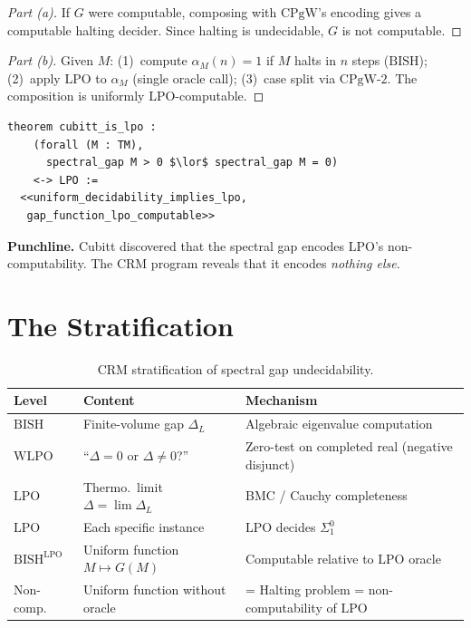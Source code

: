 \documentclass[11pt,a4paper]{article}
\theoremstyle{plain}
\theoremstyle{definition}
\newcommand{\LPO}{\ensuremath{\mathrm{LPO}}}
\newcommand{\WLPO}{\ensuremath{\mathrm{WLPO}}}
\newcommand{\BISH}{\ensuremath{\mathrm{BISH}}}
\newcommand{\CPgW}{\ensuremath{\mathrm{CPgW}}}
\begin{document}
\begin{proof}[Part (a)]
If $G$ were computable, composing with $\CPgW$'s encoding gives a
computable halting decider. Since halting is undecidable, $G$ is not
computable.
\end{proof}

\begin{proof}[Part (b)]
Given $M$: (1)~compute $\alpha_M(n) = 1$ if $M$ halts in $n$ steps
($\BISH$); (2)~apply $\LPO$ to $\alpha_M$ (single oracle call);
(3)~case split via $\CPgW\text{-}2$. The composition is uniformly
$\LPO$-computable.
\end{proof}

\begin{lstlisting}[caption={Theorem 5: Cubitt $\equiv$ LPO (UniformDecidability.lean)}]
theorem cubitt_is_lpo :
    (forall (M : TM),
      spectral_gap M > 0 $\lor$ spectral_gap M = 0)
    <-> LPO :=
  <<uniform_decidability_implies_lpo,
   gap_function_lpo_computable>>
\end{lstlisting}

\medskip\noindent
\textbf{Punchline.} Cubitt discovered that the spectral gap encodes
$\LPO$'s non-computability. The CRM program reveals that it
encodes \emph{nothing else}.

\section{The Stratification}\label{sec:strat}

\begin{table}[ht]
\centering
\caption{CRM stratification of spectral gap undecidability.}
\label{tab:strat}
\begin{tabular}{@{}llp{7cm}@{}}
\toprule
\textbf{Level} & \textbf{Content} & \textbf{Mechanism} \\
\midrule
$\BISH$ & Finite-volume gap $\Delta_L$ & Algebraic eigenvalue computation \\
$\WLPO$ & ``$\Delta = 0$ or $\Delta \neq 0$?'' & Zero-test on completed real (negative disjunct) \\
$\LPO$  & Thermo.\ limit $\Delta = \lim \Delta_L$ & BMC / Cauchy completeness \\
$\LPO$  & Each specific instance & $\LPO$ decides $\Sigma^0_1$ \\
$\BISH^{\LPO}$ & Uniform function $M \mapsto G(M)$ & Computable relative to $\LPO$ oracle \\
Non-comp. & Uniform function without oracle & = Halting problem = non-computability of $\LPO$ \\
\bottomrule
\end{tabular}
\end{table}
\end{document}

